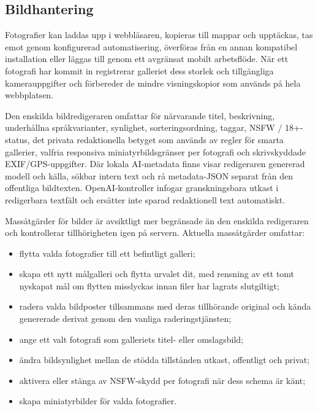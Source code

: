 \documentclass[11pt,a4paper]{article}
\begin{document}
\subsection{Bildhantering}
\label{sec:media}

Fotografier kan laddas upp i webbläsaren, kopieras till mappar och upptäckas,
tas emot genom konfigurerad automatisering, överföras från en annan kompatibel
installation eller läggas till genom ett avgränsat mobilt arbetsflöde. När ett
fotografi har kommit in registrerar galleriet dess storlek och tillgängliga
kamerauppgifter och förbereder de mindre visningskopior som används på hela
webbplatsen.

Den enskilda bildredigeraren omfattar för närvarande titel, beskrivning,
underhållna språkvarianter, synlighet, sorteringsordning, taggar, NSFW /
18+-status, det privata redaktionella betyget som används av regler för smarta
gallerier, valfria responsiva miniatyrbildsgränser per fotografi och
skrivskyddade EXIF/GPS-uppgifter. Där lokala AI-metadata finns visar redigeraren
genererad modell och källa, sökbar intern text och rå metadata-JSON separat från
den offentliga bildtexten. OpenAI-kontroller infogar granskningsbara utkast i
redigerbara textfält och ersätter inte sparad redaktionell text automatiskt.

Massåtgärder för bilder är avsiktligt mer begränsade än den enskilda redigeraren
och kontrollerar tillhörigheten igen på servern. Aktuella massåtgärder omfattar:

\begin{itemize}
  \item flytta valda fotografier till ett befintligt galleri;
  \item skapa ett nytt målgalleri och flytta urvalet dit, med rensning av ett
  tomt nyskapat mål om flytten misslyckas innan filer har lagrats slutgiltigt;
  \item radera valda bildposter tillsammans med deras tillhörande original och
  kända genererade derivat genom den vanliga raderingstjänsten;
  \item ange ett valt fotografi som galleriets titel- eller omslagsbild;
  \item ändra bildsynlighet mellan de stödda tillstånden utkast, offentligt och
  privat;
  \item aktivera eller stänga av NSFW-skydd per fotografi när dess schema är
  känt;
  \item skapa miniatyrbilder för valda fotografier.
\end{itemize}
\end{document}
